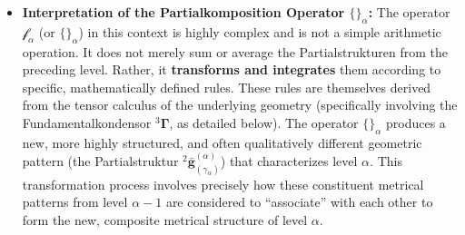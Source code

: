 \documentclass[
    12pt,              %
    a4paper,           %
    headings=normal,   %
    twoside=true,      %
    BCOR=8mm,          %
]{scrbook}
\newcommand{\q}[1]{\enquote{#1}}
\newcommand{\fundamentalkondensor}{{}^3\bm{\Gamma}}
\newcommand{\kaskadenstufe}{\alpha}
\begin{document}
\begin{itemize}
    \item   \textbf{Interpretation of the Partialkomposition Operator \(\{\}_\alpha\):} The operator \(\mathcal{f}_\alpha\) (or \(\{\}_\alpha\)) in this context is highly complex and is not a simple arithmetic operation. It does not merely sum or average the Partialstrukturen from the preceding level. Rather, it \textbf{transforms and integrates} them according to specific, mathematically defined rules. These rules are themselves derived from the tensor calculus of the underlying geometry (specifically involving the Fundamentalkondensor \(\fundamentalkondensor\), as detailed below). The operator \(\{\}_\alpha\) produces a new, more highly structured, and often qualitatively different geometric pattern (the Partialstruktur \({}^2\bar{\mathbf{g}}^{(\alpha)}_{(\gamma_{\alpha})}\)) that characterizes level \(\kaskadenstufe\). This transformation process involves precisely how these constituent metrical patterns from level \(\kaskadenstufe-1\) are considered to \q{associate} with each other to form the new, composite metrical structure of level \(\kaskadenstufe\).
\end{itemize}
\end{document}
